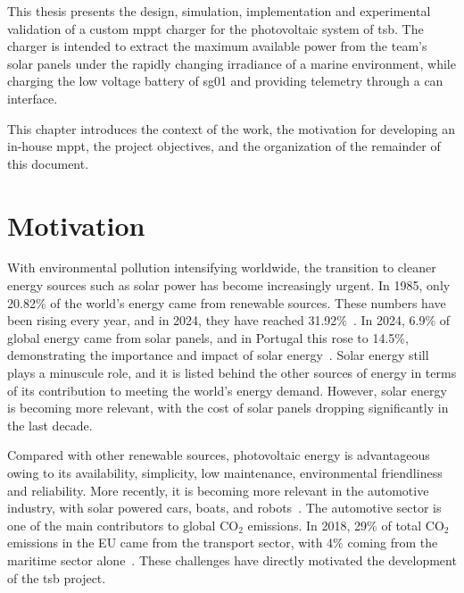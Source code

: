 \label{chap:introduction}

This thesis presents the design, simulation, implementation and experimental
validation of a custom \ac{mppt} charger for the photovoltaic system of
\ac{tsb}. The charger is intended to extract the maximum available power from
the team's solar panels under the rapidly changing irradiance of a marine
environment, while charging the low voltage battery of \ac{sg01} and providing
telemetry through a \ac{can} interface.

This chapter introduces the context of the work, the motivation for developing
an in-house \ac{mppt}, the project objectives, and the organization of the
remainder of this document.

\section{Motivation}
\label{sec:introduction:motivation}

With environmental pollution intensifying worldwide, the transition to cleaner energy sources such as solar power has become increasingly urgent.
In 1985, only 20.82\% of the world's energy came from renewable sources. These numbers have been rising every year, and in 2024, they have reached 31.92\%~\cite{ourworldindata_electricity_mix_2025}. In 2024, 6.9\% of global energy came from solar panels, and in Portugal this rose to 14.5\%, demonstrating the importance and impact of solar energy~\cite{ourworldindata_electricity_mix_2025}. Solar energy still plays a minuscule role, and it is listed behind the other sources of energy in terms of its contribution to meeting the world's energy demand. However, solar energy is becoming more relevant, with the cost of solar panels dropping significantly in the last decade. 

Compared with other renewable sources, photovoltaic energy is advantageous owing to its availability, simplicity, low maintenance, environmental friendliness and reliability.
More recently, it is becoming more relevant in the automotive industry, with solar powered cars, boats, and robots~\cite{shahira2022_electrical_design_solar_boat}. The automotive sector is one of the main contributors to global $\text{CO}_2$ emissions. In 2018, 29\% of total $\text{CO}_2$ emissions in the EU came from the transport sector, with 4\% coming from the maritime sector alone~\cite{icct_transport_eu_carbon_budget}.
These challenges have directly motivated the development of the \ac{tsb} project.

